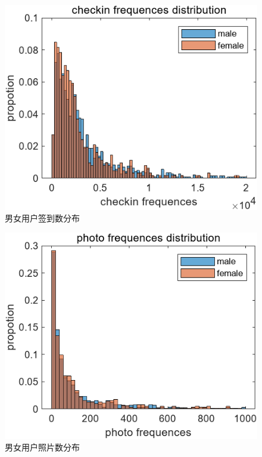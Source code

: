 \documentclass[UTF8]{ctexart}
\begin{document}
		\begin{figure}[H]
			\centering
			\includegraphics{checkinDis_male&female.png}
			\caption{男女用户签到数分布}
			\label{cd_mf}
		\end{figure}
		\begin{figure}[H]
			\centering
			\includegraphics{photoDis_male&female.png}
			\caption{男女用户照片数分布}
			\label{pd_mf}
		\end{figure}
\end{document}
